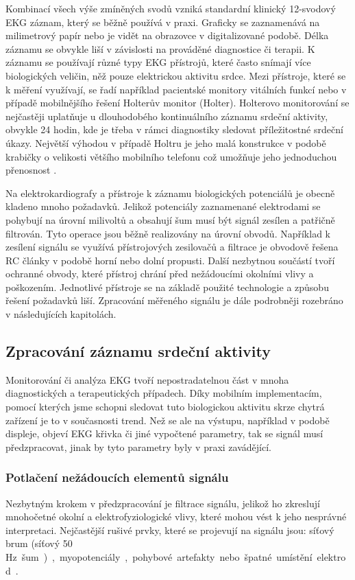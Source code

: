 Kombinací všech výše zmíněných svodů vzniká standardní klinický 12-svodový EKG
záznam, který se běžně používá v praxi. Graficky se zaznamenává na milimetrový
papír nebo je vidět na obrazovce v digitalizované podobě. Délka záznamu se
obvykle liší v závislosti na prováděné diagnostice či terapii. K záznamu se
používají různé typy EKG přístrojů, které často snímají více biologických
veličin, něž pouze elektrickou aktivitu srdce. Mezi přístroje, které se k měření
využívají, se řadí například pacientské monitory vitálních funkcí nebo v případě
mobilnějšího řešení Holterův monitor (Holter). Holterovo monitorování se
nejčastěji uplatňuje u dlouhodobého kontinuálního záznamu srdeční aktivity,
obvykle 24 hodin, kde je třeba v rámci diagnostiky sledovat příležitostné
srdeční úkazy. Největší výhodou v případě Holtru je jeho malá konstrukce v
podobě krabičky o velikosti většího mobilního telefonu což umožňuje jeho
jednoduchou přenosnost \cite{Surawicz2008}.

Na elektrokardiografy a přístroje k záznamu biologických potenciálů je obecně
kladeno mnoho požadavků. Jelikož potenciály zaznamenané elektrodami se pohybují
na úrovní milivoltů a obsahují šum musí být signál zesílen a patřičně filtrován.
Tyto operace jsou běžně realizovány na úrovní obvodů. Například k zesílení
signálu se využívá přístrojových zesilovačů a filtrace je obvodově řešena RC
články v podobě horní nebo dolní propusti. Další nezbytnou součástí tvoří
ochranné obvody, které přístroj chrání před nežádoucími okolními vlivy a
poškozením. Jednotlivé přístroje se na základě použité technologie a způsobu
řešení požadavků liší. Zpracování měřeného signálu je dále podrobněji rozebráno
v následujících kapitolách.

\subsection{Zpracování záznamu srdeční aktivity}
Monitorování či analýza EKG tvoří nepostradatelnou část v mnoha diagnostických a
terapeutických případech. Díky mobilním implementacím, pomocí kterých jsme
schopni sledovat tuto biologickou aktivitu skrze chytrá zařízení je to v
současnosti trend. Než se ale na výstupu, například v podobě displeje, objeví
EKG křivka či jiné vypočtené parametry, tak se signál musí předzpracovat, jinak
by tyto parametry byly v praxi zavádějící.

\subsubsection{Potlačení nežádoucích elementů signálu}
Nezbytným krokem v předzpracování je filtrace signálu, jelikož ho zkreslují
mnohočetné okolní a elektrofyziologické vlivy, které mohou vést k jeho nesprávné
interpretaci. Nejčastější rušivé prvky, které se projevují na signálu jsou:
síťový brum (síťový 50 \si\Hz~šum), myopotenciály, pohybové artefakty nebo
špatné umístění elektrod. \cite{Surawicz2008}. 

